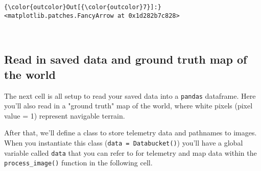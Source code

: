 \documentclass[11pt]{article}
\begin{document}
\begin{Verbatim}[commandchars=\\\{\}]
{\color{outcolor}Out[{\color{outcolor}7}]:} <matplotlib.patches.FancyArrow at 0x1d282b7c828>
\end{Verbatim}
            
    \begin{center}
    \end{center}
    { \hspace*{\fill} \\}
    
    \subsection{Read in saved data and ground truth map of the
world}\label{read-in-saved-data-and-ground-truth-map-of-the-world}

The next cell is all setup to read your saved data into a
\texttt{pandas} dataframe. Here you'll also read in a "ground truth" map
of the world, where white pixels (pixel value = 1) represent navigable
terrain.

After that, we'll define a class to store telemetry data and pathnames
to images. When you instantiate this class
(\texttt{data\ =\ Databucket()}) you'll have a global variable called
\texttt{data} that you can refer to for telemetry and map data within
the \texttt{process\_image()} function in the following cell.
\end{document}
